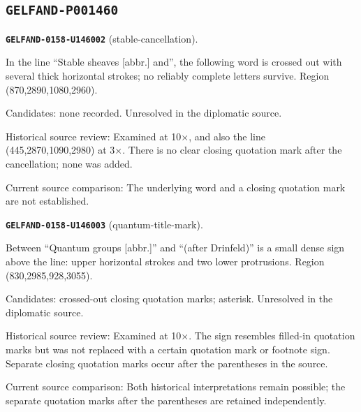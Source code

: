 \subsection*{\texttt{GELFAND-P001460}}
\par\noindent\leavevmode{}\label{GELFAND-0158-U146002}\label{GELFAND-P001460:stable-cancellation}\textbf{\texttt{GELFAND-0158-U146002}} (stable-cancellation).\nopagebreak[4]\par
In the line “Stable sheaves [abbr.] and”, the following word is crossed out with several thick horizontal strokes; no reliably complete letters survive. Region (870,2890,1080,2960).\par
Candidates: none recorded. Unresolved in the diplomatic source.\par
Historical source review: Examined at 10×, and also the line (445,2870,1090,2980) at 3×. There is no clear closing quotation mark after the cancellation; none was added.\par
Current source comparison: The underlying word and a closing quotation mark are not established.\par\medskip
\par\noindent\leavevmode{}\label{GELFAND-0158-U146003}\label{GELFAND-P001460:quantum-title-mark}\textbf{\texttt{GELFAND-0158-U146003}} (quantum-title-mark).\nopagebreak[4]\par
Between “Quantum groups [abbr.]” and “(after Drinfeld)” is a small dense sign above the line: upper horizontal strokes and two lower protrusions. Region (830,2985,928,3055).\par
Candidates: crossed-out closing quotation marks; asterisk. Unresolved in the diplomatic source.\par
Historical source review: Examined at 10×. The sign resembles filled-in quotation marks but was not replaced with a certain quotation mark or footnote sign. Separate closing quotation marks occur after the parentheses in the source.\par
Current source comparison: Both historical interpretations remain possible; the separate quotation marks after the parentheses are retained independently.\par\medskip
